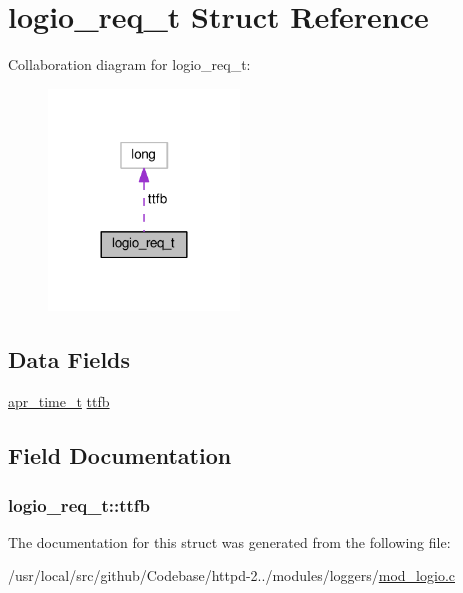 \hypertarget{structlogio__req__t}{}\section{logio\+\_\+req\+\_\+t Struct Reference}
\label{structlogio__req__t}


Collaboration diagram for logio\+\_\+req\+\_\+t\+:
\nopagebreak
\begin{figure}[H]
\begin{center}
\leavevmode
\includegraphics[width=144pt]{structlogio__req__t__coll__graph}
\end{center}
\end{figure}
\subsection*{Data Fields}
\begin{DoxyCompactItemize}
\item 
\hyperlink{group__apr__time_gadb4bde16055748190eae190c55aa02bb}{apr\+\_\+time\+\_\+t} \hyperlink{structlogio__req__t_ac60fd75004abfd48f0f1be2973ce3321}{ttfb}
\end{DoxyCompactItemize}


\subsection{Field Documentation}
\subsubsection[{\texorpdfstring{ttfb}{ttfb}}]{ logio\+\_\+req\+\_\+t\+::ttfb}\hypertarget{structlogio__req__t_ac60fd75004abfd48f0f1be2973ce3321}{}\label{structlogio__req__t_ac60fd75004abfd48f0f1be2973ce3321}


The documentation for this struct was generated from the following file\+:\begin{DoxyCompactItemize}
\item 
/usr/local/src/github/\+Codebase/httpd-\/2../modules/loggers/\hyperlink{mod__logio_8c}{mod\+\_\+logio.\+c}\end{DoxyCompactItemize}
